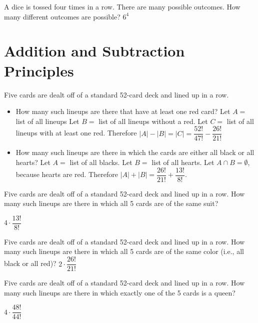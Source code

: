 \documentclass[openany, 11pt]{book}
\begin{document}
\begin{exercise}{}{}
	A dice is tossed four times in a row. There are many
	possible outcomes. How many different outcomes are possible?
	$6^4$
\end{exercise}

\section{Addition and Subtraction Principles}
\begin{exercise}{}{}
	Five cards are dealt off of a standard 52-card deck and
	lined up in a row.
	\begin{itemize}
		\item How many such lineups are there that have at least one red card?
		      Let $A=$ list of all lineups
		      Let $B=$ list of all lineups without a red.
		      Let $C=$ list of all lineups with at least one red.
		      Therefore $|A| - |B| = |C| = \dfrac{52!}{47!} - \dfrac{26!}{21!}$
		\item How many such lineups are there in which the cards are either all
		      black or all hearts?
		      Let $A=$ list of all blacks.
		      Let $B=$ list of all hearts.
		      Let $A \cap B= \emptyset$, because hearts are red.
		      Therefore $|A|+ |B| =\dfrac{26!}{21!} + \dfrac{13!}{8!}$.
	\end{itemize}
\end{exercise}

\begin{exercise}{}{}
	Five cards are dealt off of a standard 52-card deck and lined up in a row.
	How many such lineups are there in which all 5 cards are of the same suit?

	$4 \cdot \dfrac{13!}{8!}$
\end{exercise}

\begin{exercise}{}{}
	Five cards are dealt off of a standard 52-card deck and lined up in a row. How many such lineups are there in which all 5 cards are of the same color (i.e., all black or all red)?
	$2 \cdot \dfrac{26!}{21!}$
\end{exercise}

\begin{exercise}{}{}
	Five cards are dealt off of a standard 52-card deck and lined up in a row.
	How many such lineups are there in which exactly one of the 5 cards is a
	queen?

	$4 \cdot \dfrac{48!}{44!}$
\end{exercise}
\end{document}
